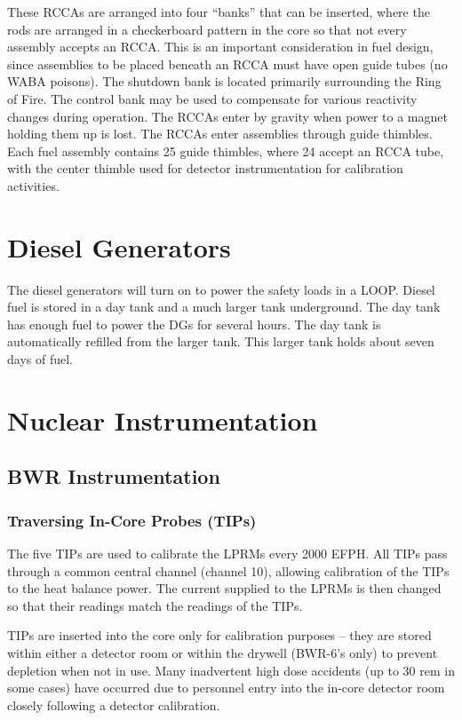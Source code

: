 \documentclass[10pt]{article}
\begin{document}
These RCCAs are arranged into four ``banks'' that can be inserted, where the rods are arranged in a checkerboard pattern in the core so that not every assembly accepts an RCCA. This is an important consideration in fuel design, since assemblies to be placed beneath an RCCA must have open guide tubes (no WABA poisons). The shutdown bank is located primarily surrounding the Ring of Fire. The control bank may be used to compensate for various reactivity changes during operation. The RCCAs enter by gravity when power to a magnet holding them up is lost. The RCCAs enter assemblies through guide thimbles. Each fuel assembly contains 25 guide thimbles, where 24 accept an RCCA tube, with the center thimble used for detector instrumentation for calibration activities. 

\section{Diesel Generators}

The diesel generators will turn on to power the safety loads in a LOOP. Diesel fuel is stored in a day tank and a much larger tank underground. The day tank has enough fuel to power the DGs for several hours. The day tank is automatically refilled from the larger tank. This larger tank holds about seven days of fuel. 

\section{Nuclear Instrumentation}

\subsection{BWR Instrumentation}
\subsubsection{Traversing In-Core Probes (TIPs)}

The five TIPs are used to calibrate the LPRMs every 2000 EFPH. All TIPs pass through a common central channel (channel 10), allowing calibration of the TIPs to the heat balance power. The current supplied to the LPRMs is then changed so that their readings match the readings of the TIPs. 

TIPs are inserted into the core only for calibration purposes – they are stored within either a detector room or within the drywell (BWR-6’s only) to prevent depletion when not in use. Many inadvertent high dose accidents (up to 30 rem in some cases) have occurred due to personnel entry into the in-core detector room closely following a detector calibration. 
\end{document}
